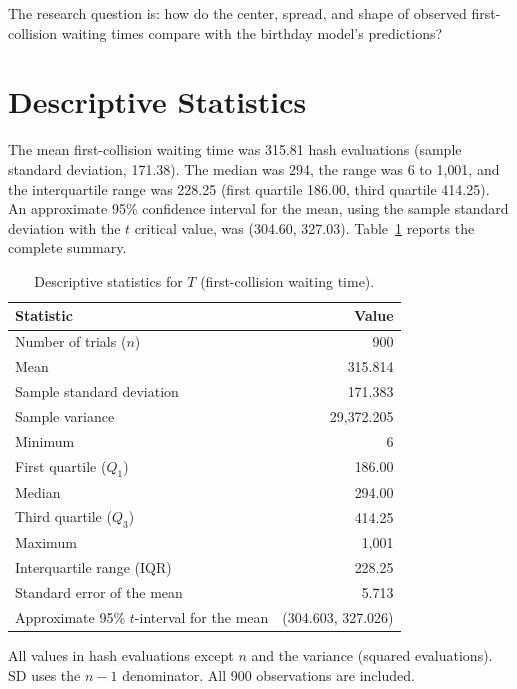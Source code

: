 \documentclass[12pt,letterpaper]{article}
\begin{document}
The research question is: how do the center, spread, and shape of observed first-collision waiting times compare with the birthday model's predictions?

\section{Descriptive Statistics}

The mean first-collision waiting time was 315.81 hash evaluations (sample standard deviation, 171.38). The median was 294, the range was 6 to 1{,}001, and the interquartile range was 228.25 (first quartile 186.00, third quartile 414.25). An approximate 95\% confidence interval for the mean, using the sample standard deviation with the $t$ critical value, was (304.60, 327.03). Table~\ref{tab:descriptive} reports the complete summary.

\begin{table}[h]
\centering
\caption{Descriptive statistics for $T$ (first-collision waiting time).}
\label{tab:descriptive}
\begin{tabular}{lr}
\toprule
Statistic & Value \\
\midrule
Number of trials ($n$)                          & 900 \\
Mean                                            & 315.814 \\
Sample standard deviation                        & 171.383 \\
Sample variance                                 & 29{,}372.205 \\
Minimum                                         & 6 \\
First quartile ($Q_1$)                          & 186.00 \\
Median                                          & 294.00 \\
Third quartile ($Q_3$)                          & 414.25 \\
Maximum                                         & 1{,}001 \\
Interquartile range (IQR)                       & 228.25 \\
Standard error of the mean                      & 5.713 \\
Approximate 95\% $t$-interval for the mean      & (304.603, 327.026) \\
\bottomrule
\end{tabular}
\par\smallskip
\footnotesize
All values in hash evaluations except $n$ and the variance (squared evaluations). SD uses the $n-1$ denominator. All 900 observations are included.
\end{table}
\end{document}
